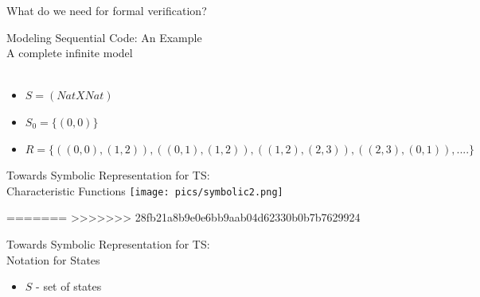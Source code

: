 \documentclass{beamer}
\begin{document}
\begin{frame}{What do we need for formal verification?}
\begin{frame}{Modeling Sequential Code: An Example \\
\small{A complete infinite model}}
\hfill
{} \\
 \\
\begin{itemize}
\item<3-> $S = (Nat X Nat)$
\item<3-> $S_0 = \{(0,0)\}$
\item<3-> $R = \{ ((0,0),(1,2)), ((0,1),(1,2)), ((1,2),(2,3)), ((2,3),(0,1)),....\}$ \\
\end{itemize}
\end{frame}

\begin{frame}{Towards Symbolic Representation for TS:\\Characteristic Functions}
\texttt{[image: pics/symbolic2.png]}
\end{frame}

=======
>>>>>>> 28fb21a8b9e0e6bb9aab04d62330b0b7b7629924
\begin{frame}{Towards Symbolic Representation for TS:\\
Notation for States}
\begin{itemize}
\item $S$ - set of states


\end{itemize}
\end{frame}
\end{frame}
\end{document}
